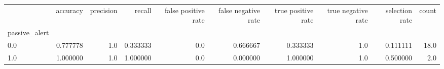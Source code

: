 \begin{tabular}{lrrrrrrrrr}
\toprule
{} &  accuracy &  precision &    recall &  false positive rate &  false negative rate &  true positive rate &  true negative rate &  selection rate &  count \\
passive\_alert &           &            &           &                      &                      &                     &                     &                 &        \\
\midrule
0.0           &  0.777778 &        1.0 &  0.333333 &                  0.0 &             0.666667 &            0.333333 &                 1.0 &        0.111111 &   18.0 \\
1.0           &  1.000000 &        1.0 &  1.000000 &                  0.0 &             0.000000 &            1.000000 &                 1.0 &        0.500000 &    2.0 \\
\bottomrule
\end{tabular}
